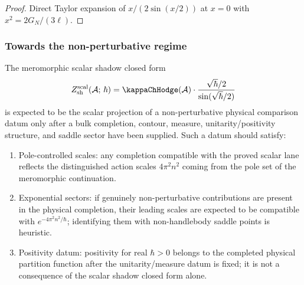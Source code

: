\begin{proof}
Direct Taylor expansion of $x/(2\sin(x/2))$ at $x = 0$ with $x^2 = 2G_N/(3\ell)$.
\end{proof}

\subsubsection{Towards the non-perturbative regime}

\begin{conjecture}
\label{conj:thqg-I-non-perturbative}
The meromorphic scalar shadow closed form
\[
Z_{\mathrm{sh}}^{\mathrm{scal}}(\cA;\,\hbar)
=\kappaChHodge(\cA)\cdot
\frac{\sqrt{\hbar}/2}{\sin(\sqrt{\hbar}/2)}
\]
is expected to be the scalar projection of a non-perturbative physical
comparison datum only after a bulk completion, contour, measure,
unitarity/positivity structure, and saddle sector have been supplied.
Such a datum should satisfy:
\begin{enumerate}[label=\textup{(\roman*)}]
\item Pole-controlled scales: any completion compatible with the proved scalar lane reflects the distinguished action scales $4\pi^2 n^2$ coming from the pole set of the meromorphic continuation.
\item Exponential sectors: if genuinely non-perturbative contributions are present in the physical completion, their leading scales are expected to be compatible with $e^{-4\pi^2 n^2/\hbar}$; identifying them with non-handlebody saddle points is heuristic.
\item Positivity datum: positivity for real $\hbar > 0$ belongs to the completed physical partition function after the unitarity/measure datum is fixed; it is not a consequence of the scalar shadow closed form alone.
\end{enumerate}
\end{conjecture}

